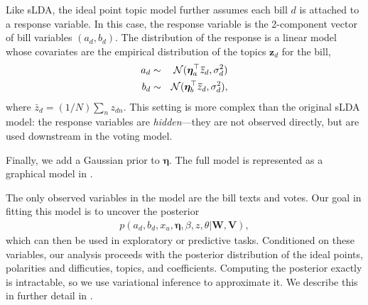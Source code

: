 


Like sLDA, the ideal point topic model further assumes each bill
$d$ is attached to a response variable.  In this case, the
response variable is the 2-component vector of bill variables $(a_d,
b_d)$.  The distribution of the response is a linear model whose
covariates are the empirical distribution of the topics $\bm z_d$ for the
bill,
\begin{eqnarray*}
  a_d &\sim& {\cal N}(\bm \eta_a^\top \bm \bar{z}_d, \sigma_d^2) \nonumber \\
  b_d &\sim& {\cal N}(\bm \eta_b^\top \bm \bar{z}_d, \sigma_d^2), \nonumber \\
\end{eqnarray*}
where $\bar{z}_d = (1/N) \sum_n z_{dn}$.  This setting is more complex
than the original sLDA model: the response variables are
\textit{hidden}---they are not observed directly, but are used
downstream in the voting model.

Finally, we add a Gaussian prior to $\bm \eta$.  The full model is
represented as a graphical model in .

The only observed variables in the model are the bill texts and votes.
Our goal in fitting this model is to uncover the posterior
\begin{align}
  p(a_d, b_d, x_u, \bm \eta, \beta, z, \theta | \bm W, \bm V), \label{eq:posterior}
\end{align}
which can then be used in exploratory or predictive tasks.
Conditioned on these variables, our analysis proceeds with the
posterior distribution of the ideal points, polarities and
difficuties, topics, and coefficients. Computing the posterior exactly
is intractable, so we use variational inference to approximate it.  We
describe this in further detail in .


